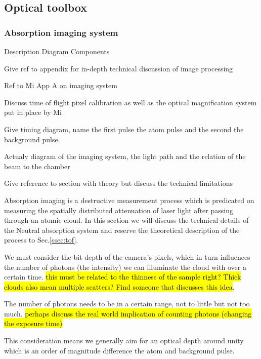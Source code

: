 \subsection{Optical toolbox} \label{ssec:op_tools}

\subsubsection{Absorption imaging system}

Description
Diagram
Components

Give ref to appendix for in-depth technical discussion of image processing

Ref to Mi App A on imaging system

Discuss time of flight pixel calibration as well as the optical magnification system put in place by Mi

Give timing diagram, name the first pulse the atom pulse and the second the background pulse.

Actualy diagram of the imaging system, the light path and the relation of the beam to the chamber

Give reference to section with theory but discuss the technical limitations
 
Absorption imaging is a destructive measurement process which is predicated on measuring the spatially distributed attenuation of laser light after passing through an atomic cloud. In this section we will discuss the technical details of the Neutral absorption system and reserve the theoretical description of the process to Sec.\ref{ssec:tof}. 

We must consider the bit depth of the camera's pixels, which in turn influences the number of photons (the intensity) we can illuminate the cloud with over a certain time. \hl{this must be related to the thinness of the sample right? Thick clouds also mean multiple scatters? Find someone that discusses this idea}.
 
The number of photons needs to be in a certain range, not to little but not too much. \hl{perhaps discuss the real world implication of counting photons (changing the exposure time)} 

This consideration means we generally aim for an optical depth around unity which is an order of magnitude difference the atom and background pulse. 

